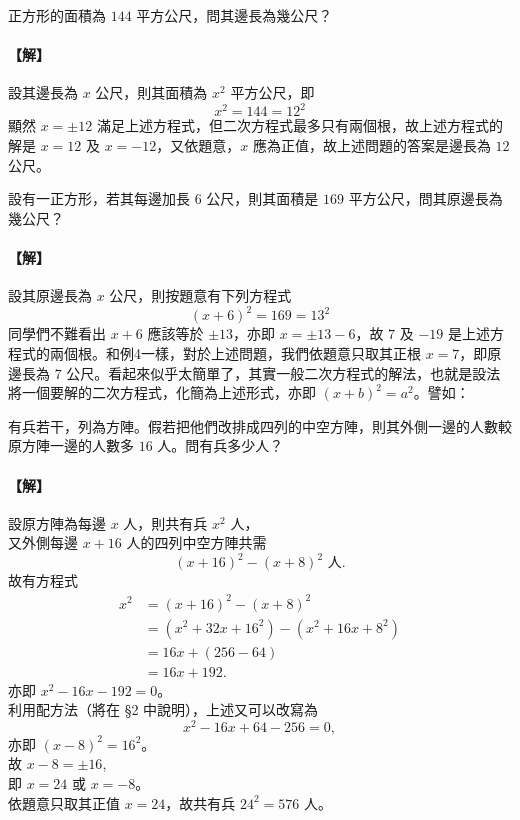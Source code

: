 \begin{example}\label{ex:b2_1-1-4}
正方形的面積為 $144$ 平方公尺，問其邊長為幾公尺？
\end{example}
\paragraph{【解】}
設其邊長為 $x$ 公尺，則其面積為 $x^2$ 平方公尺，即
\[
x^2 = 144 = 12^2
\]
顯然 $x = \pm 12$ 滿足上述方程式，但二次方程式最多只有兩個根，故上述方程式的解是 $x=12$ 及 $x=-12$，又依題意，$x$ 應為正值，故上述問題的答案是邊長為 $12$ 公尺。


\begin{example}\label{ex:b2_1-1-5}
設有一正方形，若其每邊加長 $6$ 公尺，則其面積是 $169$ 平方公尺，問其原邊長為幾公尺？
\end{example}
\paragraph{【解】}
設其原邊長為 $x$ 公尺，則按題意有下列方程式
\[
(x+6)^2 = 169 = 13^2
\]
同學們不難看出 $x+6$ 應該等於 $\pm 13$，亦即 $x=\pm 13-6$，故 $7$ 及 $-19$ 是上述方程式的兩個根。和例4一樣，對於上述問題，我們依題意只取其正根 $x=7$，即原邊長為 $7$ 公尺。看起來似乎太簡單了，其實一般二次方程式的解法，也就是設法將一個要解的二次方程式，化簡為上述形式，亦即 $(x+b)^2=a^2$。譬如：


\begin{example}\label{ex:b2_1-1-6}
有兵若干，列為方陣。假若把他們改排成四列的中空方陣，則其外側一邊的人數較原方陣一邊的人數多 $16$ 人。問有兵多少人？
\end{example}
\paragraph{【解】}
設原方陣為每邊 $x$ 人，則共有兵 $x^2$ 人，\\
又外側每邊 $x+16$ 人的四列中空方陣共需
\[
(x+16)^2 - (x+8)^2 \text{ 人}.
\]
故有方程式
\begin{align*}
x^2 &= (x+16)^2 - (x+8)^2 \\
&= (x^2 + 32x + 16^2) - (x^2 + 16x + 8^2) \\
&= 16x + (256-64) \\
&= 16x + 192.
\end{align*}
亦即 $x^2-16x-192=0$。\\
利用配方法（將在 \S 2 中說明），上述又可以改寫為\label{note:b2-ch1-ex6}
\[
x^2 - 16x + 64 - 256 = 0,
\]
亦即 $(x-8)^2 = 16^2$。\\
故 $x-8 = \pm 16$,\\
即 $x=24$ 或 $x=-8$。\\
依題意只取其正值 $x=24$，故共有兵 $24^2 = 576$ 人。


